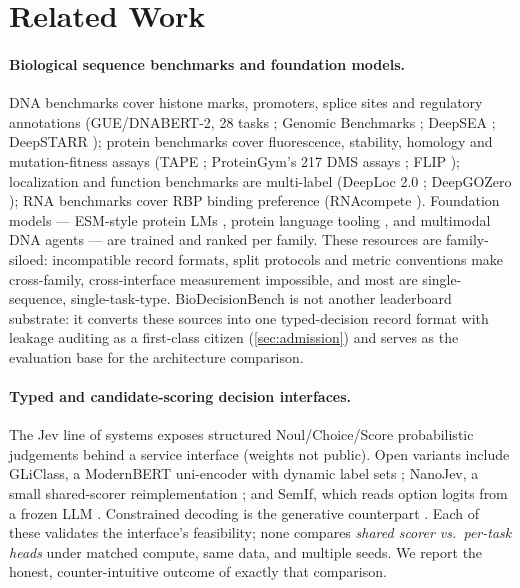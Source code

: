 \section{Related Work}
\label{sec:related}

\paragraph{Biological sequence benchmarks and foundation models.}
DNA benchmarks cover histone marks, promoters, splice sites and regulatory annotations
(GUE/DNABERT-2, 28 tasks \citep{zhou2024dnabert}; Genomic Benchmarks \citep{gresova2022genomic};
DeepSEA \citep{zhou2015deepsea}; DeepSTARR \citep{dealmeida2022deepstarr}); protein
benchmarks cover fluorescence, stability, homology and mutation-fitness assays
(TAPE \citep{rao2019tape}; ProteinGym's 217 DMS assays \citep{notin2023proteingym};
FLIP \citep{dallago2021flip}); localization and function benchmarks
are multi-label (DeepLoc 2.0 \citep{thumuluri2022deeploc}; DeepGOZero
\citep{kulmanov2022deepgozero}); RNA benchmarks cover RBP binding preference
(RNAcompete \citep{ray2013rnacompete}). Foundation models --- ESM-style protein LMs
\citep{lin2023esm2}, protein language tooling \citep{xu2023protst,xu2023biotranslator}, and
multimodal DNA agents \citep{almeida2025chatnt} --- are trained and ranked per family. These
resources are family-siloed: incompatible record formats, split protocols and metric
conventions make cross-family, cross-interface measurement impossible, and most are
single-sequence, single-task-type. BioDecisionBench is not another leaderboard substrate: it
converts these sources into one typed-decision record format with leakage auditing as a
first-class citizen (\cref{sec:admission}) and serves as the evaluation base for the
architecture comparison.

\paragraph{Typed and candidate-scoring decision interfaces.}
The Jev line of systems \citep{almeida2026jev} exposes structured Noul/Choice/Score
probabilistic judgements behind a service interface (weights not public). Open variants
include GLiClass, a ModernBERT uni-encoder with dynamic label sets
\citep{gliclass2025}; NanoJev, a small shared-scorer reimplementation
\citep{nanojev2026}; and SemIf, which reads option logits from a frozen LLM
\citep{semif2025}. Constrained decoding is the generative counterpart
\citep{scholak2021picard}. Each of these validates the interface's feasibility; none
compares \emph{shared scorer vs.\ per-task heads} under matched compute, same data, and
multiple seeds. We report the honest, counter-intuitive outcome of exactly that comparison.

